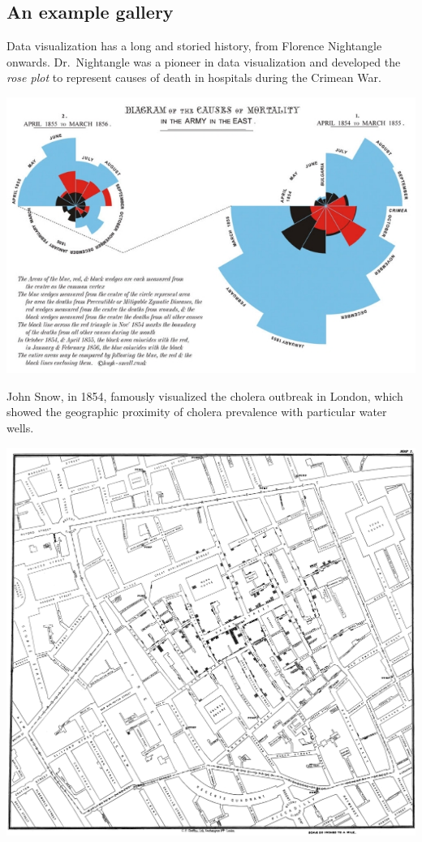 \documentclass[
  letterpaper,
]{scrbook}
\begin{document}
\hypertarget{an-example-gallery}{%
\subsection{An example gallery}\label{an-example-gallery}}

Data visualization has a long and storied history, from Florence Nightangle onwards. Dr.~Nightangle was a pioneer in data visualization and developed the \emph{rose plot} to represent causes of death in hospitals during the Crimean War.

\includegraphics{graphs/rose.jpg}

John Snow, in 1854, famously visualized the cholera outbreak in London, which showed the geographic proximity of cholera prevalence with particular water wells.

\includegraphics{graphs/snow_map.png}
\end{document}
